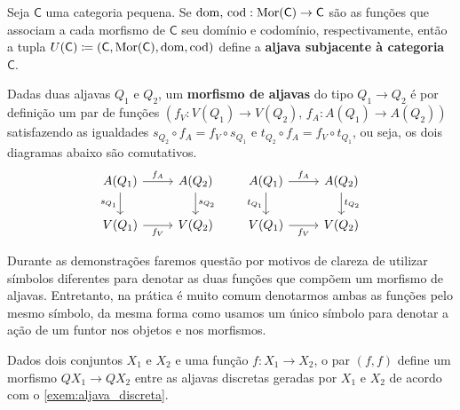 \begin{exem}\label{exem:aljava_subjacente_categoria}
    Seja $\mathsf{C}$ uma categoria pequena.
    Se $\mathrm{dom},\,\mathrm{cod}: \mathrm{Mor}(\mathsf{C}) \to \mathsf{C}$ são as funções que associam a cada morfismo de $\mathsf{C}$ seu domínio e codomínio, respectivamente, então a tupla $U(\mathsf{C}) \coloneqq (\mathsf{C},\mathrm{Mor}(\mathsf{C}),\mathrm{dom},\mathrm{cod})$ define a \textbf{aljava subjacente à categoria} $\mathsf{C}$.
\end{exem}

\begin{defin}\label{defin:morfismo_aljavas}
    Dadas duas aljavas $Q_1$ e $Q_2$, um \textbf{morfismo de aljavas} do tipo $Q_1 \to Q_2$ é por definição um par de funções $(f_V: V(Q_1) \to V(Q_2),\, f_A: A(Q_1) \to A(Q_2))$ satisfazendo as igualdades $s_{Q_2} \circ f_A = f_V \circ s_{Q_1}$ e $t_{Q_2} \circ f_A = f_V \circ t_{Q_1}$, ou seja, os dois diagramas abaixo são comutativos.
    \begin{displaymath}
        \begin{tikzcd}
            A(Q_1)
            \arrow[r, "f_A"]
            \arrow[d, "s_{Q_1}" swap]
            & A(Q_2)
            \arrow[d, "s_{Q_2}"]
            \\ V(Q_1)
            \arrow[r, "f_V" swap]
            & V(Q_2)
        \end{tikzcd}
        \qquad
        \begin{tikzcd}
            A(Q_1)
            \arrow[r, "f_A"]
            \arrow[d, "t_{Q_1}" swap]
            & A(Q_2)
            \arrow[d, "t_{Q_2}"]
            \\ V(Q_1)
            \arrow[r, "f_V" swap]
            & V(Q_2)
        \end{tikzcd}
    \end{displaymath}
\end{defin}

Durante as demonstrações faremos questão por motivos de clareza de utilizar símbolos diferentes para denotar as duas funções que compõem um morfismo de aljavas.
Entretanto, na prática é muito comum denotarmos ambas as funções pelo mesmo símbolo, da mesma forma como usamos um único símbolo para denotar a ação de um funtor nos objetos e nos morfismos.

\begin{exem}
    Dados dois conjuntos $X_1$ e $X_2$ e uma função $f: X_1 \to X_2$, o par $(f,f)$ define um morfismo $QX_1 \to QX_2$ entre as aljavas discretas geradas por $X_1$ e $X_2$ de acordo com o \cref{exem:aljava_discreta}.
\end{exem}


